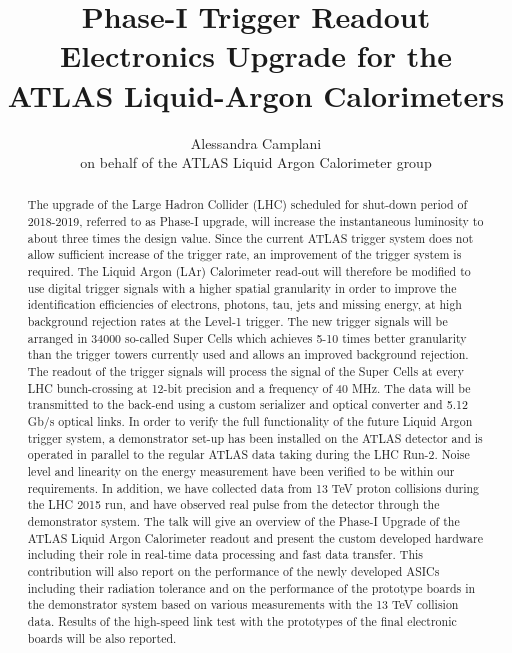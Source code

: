 \documentclass{llncs}
\title{Phase-I Trigger Readout Electronics Upgrade for the ATLAS Liquid-Argon Calorimeters}
\author{Alessandra Camplani\inst{1}\inst{2} \\ 
on behalf of the ATLAS Liquid Argon Calorimeter group}
\institute{Universt\'a degli Studi di Milano
\and INFN Milano \\
\email{alessandra.camplani@mi.infn.it}}
\begin{document}
\maketitle

\begin{abstract}
The upgrade of the Large Hadron Collider (LHC) scheduled for shut-down period of 2018-2019, referred to as Phase-I upgrade, will increase the instantaneous luminosity to about three times the design value. Since the current ATLAS trigger system does not allow sufficient increase of the trigger rate, an improvement of the trigger system is required. The Liquid Argon (LAr) Calorimeter read-out will therefore be modified to use digital trigger signals with a higher spatial granularity in order to improve the identification efficiencies of electrons, photons, tau, jets and missing energy, at high background rejection rates at the Level-1 trigger. The new trigger signals will be arranged in 34000 so-called Super Cells which achieves 5-10 times better granularity than the trigger towers currently used and allows an improved background rejection. The readout of the trigger signals will process the signal of the Super Cells at every LHC bunch-crossing at 12-bit precision and a frequency of 40 MHz. The data will be transmitted to the back-end using a custom serializer and optical converter and 5.12 Gb/s optical links. In order to verify the full functionality of the future Liquid Argon trigger system, a demonstrator set-up has been installed on the ATLAS detector and is operated in parallel to the regular ATLAS data taking during the LHC Run-2. Noise level and linearity on the energy measurement have been verified to be within our requirements. In addition, we have collected data from 13 TeV proton collisions during the LHC 2015 run, and have observed real pulse from the detector through the demonstrator system. The talk will give an overview of the Phase-I Upgrade of the ATLAS Liquid Argon Calorimeter readout and present the custom developed hardware including their role in real-time data processing and fast data transfer. This contribution will also report on the performance of the newly developed ASICs including their radiation tolerance and on the performance of the prototype boards in the demonstrator system based on various measurements with the 13 TeV collision data. Results of the high-speed link test with the prototypes of the final electronic boards will be also reported.
\end{abstract}
\end{document}
